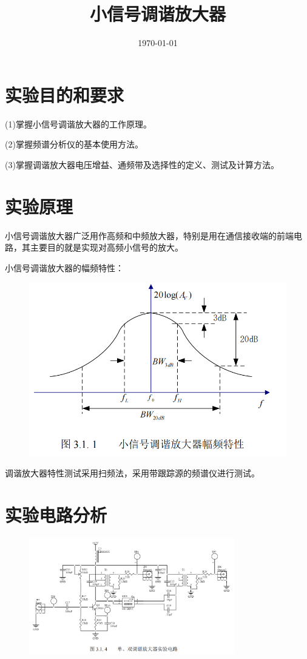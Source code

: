 \documentclass{../source/Experiment}
\title{小信号调谐放大器}
\date{\today}
\begin{document}
\section{实验目的和要求}
    (1)掌握小信号调谐放大器的工作原理。

    (2)掌握频谱分析仪的基本使用方法。

    (3)掌握调谐放大器电压增益、通频带及选择性的定义、测试及计算方法。

    \section{实验原理}
    小信号调谐放大器广泛用作高频和中频放大器，特别是用在通信接收端的前端电路，其主要目的就是实现对高频小信号的放大。

    小信号调谐放大器的幅频特性：
    \begin{figure}[H]
        \centering
        \includegraphics[scale=0.4]{pic/fig1.png}
    \end{figure}

    调谐放大器特性测试采用扫频法，采用带跟踪源的频谱仪进行测试。

    \section{实验电路分析}

    \begin{figure}[H]
        \centering
        \includegraphics[width = 0.8\textwidth]{pic/fig2.png}
    \end{figure}
\end{document}
